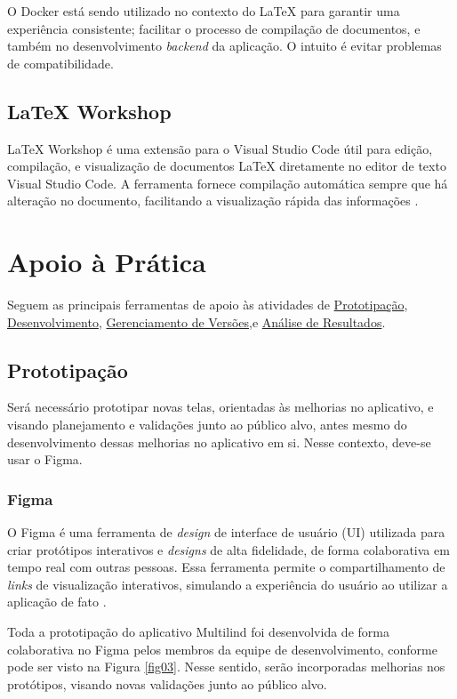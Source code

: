 O Docker está sendo utilizado no contexto do LaTeX para garantir uma experiência consistente; facilitar o 
processo de compilação de documentos, e também no desenvolvimento \textit{backend} da aplicação. O intuito é evitar problemas 
de compatibilidade.

\subsection{LaTeX Workshop}
\label{sec:LaTeX Workshop}
LaTeX Workshop é uma extensão para o Visual Studio Code útil para edição, compilação, e visualização de 
documentos LaTeX diretamente no editor de texto Visual Studio Code. A ferramenta fornece compilação 
automática sempre que há alteração no documento, facilitando a visualização rápida das informações \cite{latexworkshop}.

\section{Apoio à Prática}
\label{sec:Apoio à Prática}
Seguem as principais ferramentas de apoio às atividades de \hyperref[sec:Prototipacao]{Prototipação}, \hyperref[sec:Desenvolvimento]{Desenvolvimento}, 
\hyperref[sec:Gerenciamento de Versoes]{Gerenciamento de Versões},e \hyperref[sec:Análise de Resultados]{Análise de Resultados}.

\subsection{Prototipação}
\label{sec:Prototipacao}
Será necessário prototipar novas telas, orientadas às melhorias no aplicativo, e visando planejamento e validações 
junto ao público alvo, antes mesmo do desenvolvimento dessas melhorias no aplicativo em si. Nesse contexto, deve-se 
usar o Figma.

\subsubsection{Figma}
\label{sec:Figma}
O Figma é uma ferramenta de \textit{design} de interface de usuário (UI) utilizada para criar protótipos interativos e \textit{designs} de alta fidelidade, de forma  
colaborativa em tempo real com outras pessoas. Essa ferramenta permite o compartilhamento de \textit{links} de visualização interativos, simulando a experiência 
do usuário ao utilizar a aplicação de fato \cite{figma}.

Toda a prototipação do aplicativo Multilind foi desenvolvida de forma colaborativa no Figma pelos membros da equipe de desenvolvimento, conforme pode ser visto 
na Figura \ref{fig03}. Nesse sentido, serão incorporadas melhorias nos protótipos, visando novas validações junto ao público alvo.  


